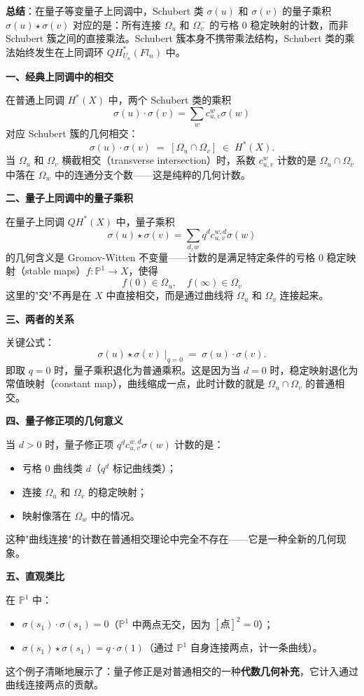 \textbf{总结}：在量子等变量子上同调中，Schubert 类 $\sigma(u)$ 和 $\sigma(v)$ 的量子乘积 $\sigma(u) \star \sigma(v)$ 对应的是：所有连接 $\Omega_u$ 和 $\Omega_v^-$ 的亏格 0 稳定映射的计数，而非 Schubert 簇之间的直接乘法。Schubert 簇本身不携带乘法结构，Schubert 类的乘法始终发生在上同调环 $QH_{U_n}^*(Fl_n)$ 中。


\textbf{一、经典上同调中的相交}

在普通上同调 $H^*(X)$ 中，两个 Schubert 类的乘积
$$\sigma(u) \cdot \sigma(v) = \sum_w c_{u,v}^w \sigma(w)$$
对应 Schubert 簇的几何相交：
$$\sigma(u) \cdot \sigma(v) \;=\; [\Omega_u \cap \Omega_v] \;\in\; H^*(X).$$
当 $\Omega_u$ 和 $\Omega_v$ 横截相交（transverse intersection）时，系数 $c_{u,v}^w$ 计数的是 $\Omega_u \cap \Omega_v$ 中落在 $\Omega_w$ 中的连通分支个数——这是纯粹的几何计数。

\textbf{二、量子上同调中的量子乘积}

在量子上同调 $QH^*(X)$ 中，量子乘积
$$\sigma(u) \star \sigma(v) = \sum_{d,w} q^d c_{u,v}^{w,d} \sigma(w)$$
的几何含义是 Gromov-Witten 不变量——计数的是满足特定条件的亏格 0 稳定映射（stable maps）$f: \mathbb{P}^1 \to X$，使得
$$f(0) \in \Omega_u, \quad f(\infty) \in \Omega_v$$
这里的"交"不再是在 $X$ 中直接相交，而是通过曲线将 $\Omega_u$ 和 $\Omega_v$ 连接起来。

\textbf{三、两者的关系}

关键公式：
$$\sigma(u) \star \sigma(v) \;\big|_{q=0} \;=\; \sigma(u) \cdot \sigma(v).$$
即取 $q = 0$ 时，量子乘积退化为普通乘积。这是因为当 $d = 0$ 时，稳定映射退化为常值映射（constant map），曲线缩成一点，此时计数的就是 $\Omega_u \cap \Omega_v$ 的普通相交。

\textbf{四、量子修正项的几何意义}

当 $d > 0$ 时，量子修正项 $q^d c_{u,v}^{w,d} \sigma(w)$ 计数的是：
\begin{itemize}
\item 亏格 0 曲线类 $d$（$q^d$ 标记曲线类）；
\item 连接 $\Omega_u$ 和 $\Omega_v$ 的稳定映射；
\item 映射像落在 $\Omega_w$ 中的情况。
\end{itemize}
这种"曲线连接"的计数在普通相交理论中完全不存在——它是一种全新的几何现象。

\textbf{五、直观类比}

在 $\mathbb{P}^1$ 中：
\begin{itemize}
\item $\sigma(s_1) \cdot \sigma(s_1) = 0$（$\mathbb{P}^1$ 中两点无交，因为 $[\text{点}]^2 = 0$）；
\item $\sigma(s_1) \star \sigma(s_1) = q \cdot \sigma(1)$（通过 $\mathbb{P}^1$ 自身连接两点，计一条曲线）。
\end{itemize}
这个例子清晰地展示了：量子修正是对普通相交的一种\textbf{代数几何补充}，它计入通过曲线连接两点的贡献。

